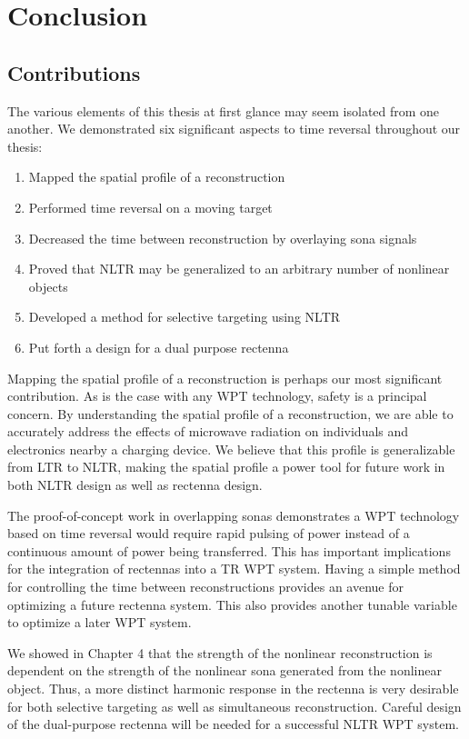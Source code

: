 \chapter{Conclusion}

\label{ch:conclusion}

\section{Contributions}

The various elements of this thesis at first glance may seem isolated from one another. We demonstrated six significant aspects to time reversal throughout our thesis:

\begin{enumerate}
\item Mapped the spatial profile of a reconstruction
\item Performed time reversal on a moving target
\item Decreased the time between reconstruction by overlaying sona signals
\item Proved that NLTR may be generalized to an arbitrary number of nonlinear objects
\item Developed a method for selective targeting using NLTR
\item Put forth a design for a dual purpose rectenna
\end{enumerate}

Mapping the spatial profile of a reconstruction is perhaps our most significant contribution. As is the case with any WPT technology, safety is a principal concern. By understanding the spatial profile of a reconstruction, we are able to accurately address the effects of microwave radiation on individuals and electronics nearby a charging device. We believe that this profile is generalizable from LTR to NLTR, making the spatial profile a power tool for future work in both NLTR design as well as rectenna design.

The proof-of-concept work in overlapping sonas demonstrates a WPT technology based on time reversal would require rapid pulsing of power instead of a continuous amount of power being transferred. This has important implications for the integration of rectennas into a TR WPT system. Having a simple method for controlling the time between reconstructions provides an avenue for optimizing a future rectenna system. This also provides another tunable variable to optimize a later WPT system.

We showed in Chapter 4 that the strength of the nonlinear reconstruction is dependent on the strength of the nonlinear sona generated from the nonlinear object. Thus, a more distinct harmonic response in the rectenna is very desirable for both selective targeting as well as simultaneous reconstruction. Careful design of the dual-purpose rectenna will be needed for a successful NLTR WPT system.

